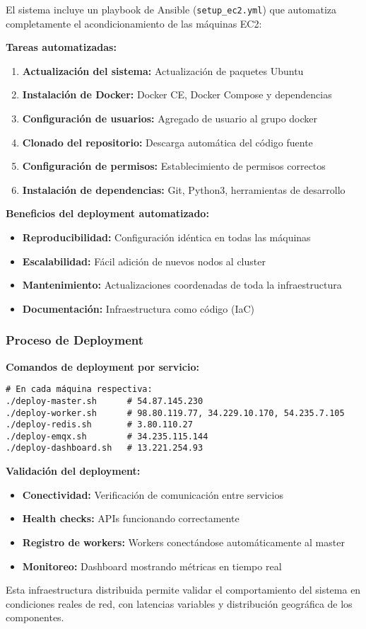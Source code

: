 El sistema incluye un playbook de Ansible (\texttt{setup\_ec2.yml}) que automatiza completamente el acondicionamiento de las máquinas EC2:

\textbf{Tareas automatizadas:}
\begin{enumerate}
    \item \textbf{Actualización del sistema:} Actualización de paquetes Ubuntu
    \item \textbf{Instalación de Docker:} Docker CE, Docker Compose y dependencias
    \item \textbf{Configuración de usuarios:} Agregado de usuario al grupo docker
    \item \textbf{Clonado del repositorio:} Descarga automática del código fuente
    \item \textbf{Configuración de permisos:} Establecimiento de permisos correctos
    \item \textbf{Instalación de dependencias:} Git, Python3, herramientas de desarrollo
\end{enumerate}

\textbf{Beneficios del deployment automatizado:}
\begin{itemize}
    \item \textbf{Reproducibilidad:} Configuración idéntica en todas las máquinas
    \item \textbf{Escalabilidad:} Fácil adición de nuevos nodos al cluster
    \item \textbf{Mantenimiento:} Actualizaciones coordenadas de toda la infraestructura
    \item \textbf{Documentación:} Infraestructura como código (IaC)
\end{itemize}

\subsubsection{Proceso de Deployment}

\textbf{Comandos de deployment por servicio:}
\begin{verbatim}
# En cada máquina respectiva:
./deploy-master.sh      # 54.87.145.230
./deploy-worker.sh      # 98.80.119.77, 34.229.10.170, 54.235.7.105
./deploy-redis.sh       # 3.80.110.27
./deploy-emqx.sh        # 34.235.115.144
./deploy-dashboard.sh   # 13.221.254.93
\end{verbatim}

\textbf{Validación del deployment:}
\begin{itemize}
    \item \textbf{Conectividad:} Verificación de comunicación entre servicios
    \item \textbf{Health checks:} APIs funcionando correctamente
    \item \textbf{Registro de workers:} Workers conectándose automáticamente al master
    \item \textbf{Monitoreo:} Dashboard mostrando métricas en tiempo real
\end{itemize}

Esta infraestructura distribuida permite validar el comportamiento del sistema en condiciones reales de red, con latencias variables y distribución geográfica de los componentes.
